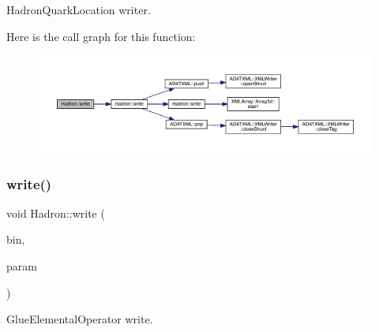 Hadron\+Quark\+Location writer. 

Here is the call graph for this function\+:\nopagebreak
\begin{figure}[H]
\begin{center}
\leavevmode
\includegraphics[width=350pt]{d1/daf/namespaceHadron_a8953a24e53ffe4d60e9c0ba26a48a9e3_cgraph}
\end{center}
\end{figure}
\mbox{\label{namespaceHadron_aee7b5924c79af024abb8c3d99f7e8b34}} 
\subsubsection{\texorpdfstring{write()}{write()}\hspace{0.1cm}{\footnotesize\ttfamily [65/95]}}
{\footnotesize\ttfamily void Hadron\+::write (\begin{DoxyParamCaption}\item[{\mbox{\hyperlink{classADATIO_1_1BinaryWriter}{Binary\+Writer}} \&}]{bin,  }\item[{const \mbox{\hyperlink{structHadron_1_1ValGlueElementalOperator__t}{Val\+Glue\+Elemental\+Operator\+\_\+t}} \&}]{param }\end{DoxyParamCaption})}



Glue\+Elemental\+Operator write. 

